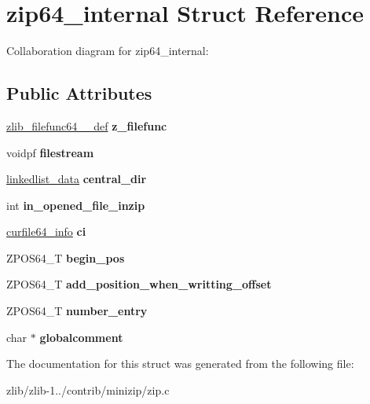 \hypertarget{structzip64__internal}{\section{zip64\+\_\+internal Struct Reference}
\label{structzip64__internal}
}


Collaboration diagram for zip64\+\_\+internal\+:
\subsection*{Public Attributes}
\begin{DoxyCompactItemize}
\item 
\hypertarget{structzip64__internal_ac4ccb50738cbefbd40e075b297c65548}{\hyperlink{structzlib__filefunc64__32__def__s}{zlib\+\_\+filefunc64\+\_\+\_\+def} {\bfseries z\+\_\+filefunc}}\label{structzip64__internal_ac4ccb50738cbefbd40e075b297c65548}

\item 
\hypertarget{structzip64__internal_a5b451e00303fe5192adf7c1d6740d754}{voidpf {\bfseries filestream}}\label{structzip64__internal_a5b451e00303fe5192adf7c1d6740d754}

\item 
\hypertarget{structzip64__internal_a869144921e51ec758f1b60dba2f1a2af}{\hyperlink{structlinkedlist__data__s}{linkedlist\+\_\+data} {\bfseries central\+\_\+dir}}\label{structzip64__internal_a869144921e51ec758f1b60dba2f1a2af}

\item 
\hypertarget{structzip64__internal_aa24353ae49bce7e6d6aa3f5994782be7}{int {\bfseries in\+\_\+opened\+\_\+file\+\_\+inzip}}\label{structzip64__internal_aa24353ae49bce7e6d6aa3f5994782be7}

\item 
\hypertarget{structzip64__internal_a05bf290332d456dbecee6d870a3b6559}{\hyperlink{structcurfile64__info}{curfile64\+\_\+info} {\bfseries ci}}\label{structzip64__internal_a05bf290332d456dbecee6d870a3b6559}

\item 
\hypertarget{structzip64__internal_adff1d5f1509675f5f1c9797c5addc1a7}{Z\+P\+O\+S64\+\_\+\+T {\bfseries begin\+\_\+pos}}\label{structzip64__internal_adff1d5f1509675f5f1c9797c5addc1a7}

\item 
\hypertarget{structzip64__internal_a74984ae4b2cdc5b5eade871ee61b2261}{Z\+P\+O\+S64\+\_\+\+T {\bfseries add\+\_\+position\+\_\+when\+\_\+writting\+\_\+offset}}\label{structzip64__internal_a74984ae4b2cdc5b5eade871ee61b2261}

\item 
\hypertarget{structzip64__internal_a2d8ae560933ed00ee61052446288f4a8}{Z\+P\+O\+S64\+\_\+\+T {\bfseries number\+\_\+entry}}\label{structzip64__internal_a2d8ae560933ed00ee61052446288f4a8}

\item 
\hypertarget{structzip64__internal_a997ca8e9d08081a280e32b7c4280f090}{char $\ast$ {\bfseries globalcomment}}\label{structzip64__internal_a997ca8e9d08081a280e32b7c4280f090}

\end{DoxyCompactItemize}


The documentation for this struct was generated from the following file\+:\begin{DoxyCompactItemize}
\item 
zlib/zlib-\/1../contrib/minizip/zip.\+c\end{DoxyCompactItemize}
